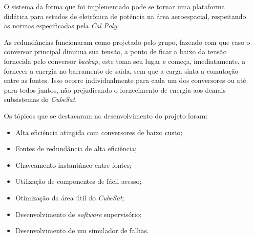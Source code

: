 \documentclass[final,3p,times,twocolumn,authoryear]{elsarticle}
\begin{document}
	O sistema da forma que foi implementado pode se tornar uma plataforma didática para estudos de eletrônica de potência na área aeroespacial, respeitando as normas especificadas pela \textit{Cal Poly}. 

	As redundâncias funcionaram como projetado pelo grupo, fazendo com que caso o conversor principal diminua sua tensão, a ponto de ficar a baixo da tensão fornecida pelo conversor \textit{backup}, este toma seu lugar e começa, imediatamente, a fornecer a energia no barramento de saída, sem que a carga sinta a comutação entre as fontes. Isso ocorre individualmente para cada um dos conversores ou até para todos juntos, não prejudicando o fornecimento de energia aos demais subsistemas do \textit{CubeSat}.

Os tópicos que se destacaram no desenvolvimento do projeto foram:
	
	\begin{itemize}
		\item Alta eficiência atingida com conversores de baixo custo;
		\item Fontes de redundância de alta eficiência;
		\item Chaveamento instantâneo entre fontes;
		\item Utilização de componentes de fácil acesso;
		\item Otimização da área útil do \textit{CubeSat};
		\item Desenvolvimento de \textit{software} supervisório;
		\item Desenvolvimento de um simulador de falhas.
	\end{itemize}






\begin{thebibliography}{00}


\bibitem[ ()]{}

\end{thebibliography}
\end{document}

